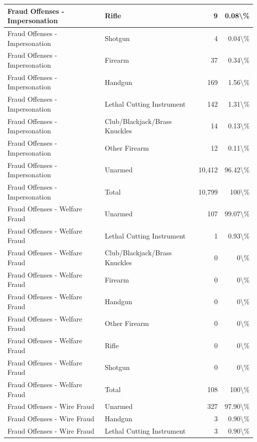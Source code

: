 \documentclass[
]{krantz}
\begin{document}
\begin{longtable}[t]{l|l|r|r}
\hline
Fraud Offenses - Impersonation & Rifle & 9 & 0.08\textbackslash{}\%\\
\hline
Fraud Offenses - Impersonation & Shotgun & 4 & 0.04\textbackslash{}\%\\
\hline
Fraud Offenses - Impersonation & Firearm & 37 & 0.34\textbackslash{}\%\\
\hline
Fraud Offenses - Impersonation & Handgun & 169 & 1.56\textbackslash{}\%\\
\hline
Fraud Offenses - Impersonation & Lethal Cutting Instrument & 142 & 1.31\textbackslash{}\%\\
\hline
Fraud Offenses - Impersonation & Club/Blackjack/Brass Knuckles & 14 & 0.13\textbackslash{}\%\\
\hline
Fraud Offenses - Impersonation & Other Firearm & 12 & 0.11\textbackslash{}\%\\
\hline
Fraud Offenses - Impersonation & Unarmed & 10,412 & 96.42\textbackslash{}\%\\
\hline
Fraud Offenses - Impersonation & Total & 10,799 & 100\textbackslash{}\%\\
\hline
Fraud Offenses - Welfare Fraud & Unarmed & 107 & 99.07\textbackslash{}\%\\
\hline
Fraud Offenses - Welfare Fraud & Lethal Cutting Instrument & 1 & 0.93\textbackslash{}\%\\
\hline
Fraud Offenses - Welfare Fraud & Club/Blackjack/Brass Knuckles & 0 & 0\textbackslash{}\%\\
\hline
Fraud Offenses - Welfare Fraud & Firearm & 0 & 0\textbackslash{}\%\\
\hline
Fraud Offenses - Welfare Fraud & Handgun & 0 & 0\textbackslash{}\%\\
\hline
Fraud Offenses - Welfare Fraud & Other Firearm & 0 & 0\textbackslash{}\%\\
\hline
Fraud Offenses - Welfare Fraud & Rifle & 0 & 0\textbackslash{}\%\\
\hline
Fraud Offenses - Welfare Fraud & Shotgun & 0 & 0\textbackslash{}\%\\
\hline
Fraud Offenses - Welfare Fraud & Total & 108 & 100\textbackslash{}\%\\
\hline
Fraud Offenses - Wire Fraud & Unarmed & 327 & 97.90\textbackslash{}\%\\
\hline
Fraud Offenses - Wire Fraud & Handgun & 3 & 0.90\textbackslash{}\%\\
\hline
Fraud Offenses - Wire Fraud & Lethal Cutting Instrument & 3 & 0.90\textbackslash{}\%\\
\hline

\end{longtable}
\end{document}
